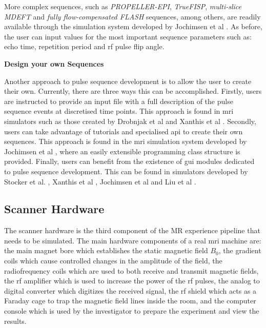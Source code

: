 \hfill

More complex sequences, such as \textit{PROPELLER-EPI}, \textit{TrueFISP}, \textit{multi-slice MDEFT} and \textit{fully flow-compensated FLASH} sequences, among others, are readily available through the simulation system developed by Jochimsen et al \cite{Jochimsen2004}.
As before, the user can input values for the most important sequence parameters such as: echo time, repetition period and \ac{rf} pulse flip angle.


\hfill

\large \textbf{Design your own Sequences} \normalsize

Another approach to pulse sequence development is to allow the user to create their own.
Currently, there are three ways this can be accomplished.
Firstly, users are instructed to provide an input file with a full description of the pulse sequence events at discretised time points.
This approach is found in \ac{mri} simulators such as those created by Drobnjak et al \cite{Drobnjak2006} and Xanthis et al \cite{Xanthis2014}.
Secondly, users can take advantage of tutorials and specialised \ac{api} to create their own sequences.
This approach is found in the \ac{mri} simulation system developed by Jochimsen et al \cite{Jochimsen2004}, where an easily extensible programming class structure is provided.
Finally, users can benefit from the existence of \ac{gui} modules dedicated to pulse sequence development.
This can be found in simulators developed by Stocker et al. \cite{Stocker2010}, Xanthis et al \cite{Xanthis2014}, Jochimsen et al \cite{Jochimsen2004} and Liu et al \cite{Liu2013}.

\hfill

\subsection{Scanner Hardware}

The scanner hardware is the third component of the MR experience pipeline that needs to be simulated.
The main hardware components of a real \ac{mri} machine are: 
the main magnet bore which establishes the static magnetic field $B_0$, 
the gradient coils which cause controlled changes in the amplitude of the field,
the radiofrequency coils which are used to both receive and transmit magnetic fields,
the \ac{rf} amplifier which is used to increase the power of the \ac{rf} pulses,
the analog to digital converter which digitizes the received signal,
the \ac{rf} shield which acts as a Faraday cage to trap the magnetic field lines inside the room, and
the computer console which is used by the investigator to prepare the experiment and view the results.

